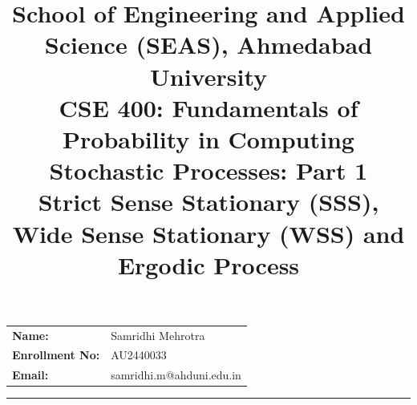 \documentclass[12pt]{article}
\title{
    \normalsize School of Engineering and Applied Science (SEAS), Ahmedabad University \\
    \vspace{0.2cm}
    \textbf{CSE 400: Fundamentals of Probability in Computing}\\
    \Large { Stochastic Processes: Part 1 \\ 
Strict Sense Stationary (SSS), Wide Sense Stationary (WSS) and Ergodic Process}
}
\author{}
\date{}
\begin{document}
\maketitle

\vspace{-2cm}
\begin{center}
    \begin{tabular}{ll}
        \textbf{Name:} & {Samridhi Mehrotra \hspace{2.5in}} \\ [1.5ex]
        \textbf{Enrollment No:} & {AU2440033 \hspace{2.5in}} \\ [1.5ex]
        \textbf{Email:} & {samridhi.m@ahduni.edu.in \hspace{2.1in}} \\ [1.5ex]
        
    \end{tabular}
\end{center}

\hrule
\vspace{0.5cm}
\end{document}
